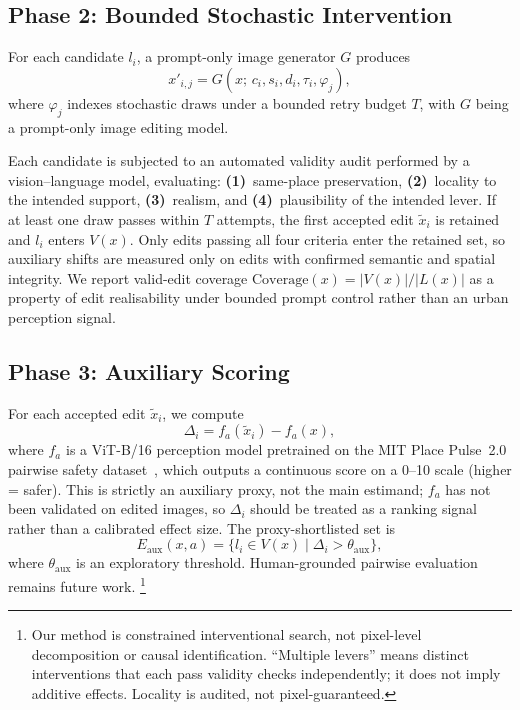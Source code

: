 \subsection{Phase 2: Bounded Stochastic Intervention}

For each candidate $l_i$, a prompt-only image generator $G$ produces
\begin{equation}
  x'_{i,j} = G(x;\, c_i, s_i, d_i, \tau_i, \varphi_j),
\end{equation}
where $\varphi_j$ indexes stochastic draws under a bounded retry budget
$T$, with $G$ being a prompt-only image editing model.

Each candidate is subjected to an automated validity audit performed by
a vision--language model,
evaluating: \textbf{(1)}~same-place preservation,
\textbf{(2)}~locality to the intended support, \textbf{(3)}~realism,
and \textbf{(4)}~plausibility of the intended lever. If at least one
draw passes within $T$ attempts, the first accepted edit $\tilde{x}_i$
is retained and $l_i$ enters $V(x)$. Only edits passing all four
criteria enter the retained set, so auxiliary shifts are measured only
on edits with confirmed semantic and spatial integrity.
We report valid-edit coverage
$\mathrm{Coverage}(x) = |V(x)| / |L(x)|$ as a property of edit
realisability under bounded prompt control rather than an urban
perception signal.

\subsection{Phase 3: Auxiliary Scoring}

For each accepted edit $\tilde{x}_i$, we compute
\begin{equation}
  \Delta_i = f_a(\tilde{x}_i) - f_a(x),
\end{equation}
where $f_a$ is a ViT-B/16 perception model pretrained on the MIT Place
Pulse~2.0 pairwise safety dataset~\cite{hou2024globalstreetscapes},
which outputs a continuous score on a 0--10 scale (higher = safer).
This is strictly an auxiliary proxy, not the main estimand; $f_a$ has
not been validated on edited images, so $\Delta_i$ should be treated as
a ranking signal rather than a calibrated effect size. The proxy-shortlisted set is
\begin{equation}
  E_{\mathrm{aux}}(x,a) = \{ l_i \in V(x) \mid \Delta_i >
  \theta_{\mathrm{aux}} \},
\end{equation}
where $\theta_{\mathrm{aux}}$ is an exploratory threshold.
Human-grounded pairwise evaluation remains future
work.%
\footnote{Our method is constrained interventional search, not
pixel-level decomposition or causal identification. ``Multiple levers''
means distinct interventions that each pass validity checks
independently; it does not imply additive effects. Locality is audited,
not pixel-guaranteed.}
